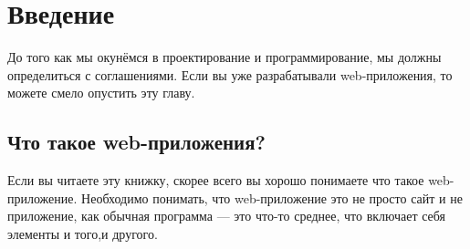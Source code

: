 \chapter{ Введение } \label{chapt1}

До того как мы окунёмся в проектирование и программирование, мы должны определиться с соглашениями. Если вы уже разрабатывали web-приложения, то можете смело опустить эту главу.

\section{ Что такое web-приложения?} \label{sect1_1}

Если вы читаете эту книжку, скорее всего вы хорошо понимаете что такое web-приложение. Необходимо понимать, что web-приложение это не просто сайт и не приложение, как обычная программа --- это что-то среднее, что включает себя элементы и того,и другого.








\clearpage